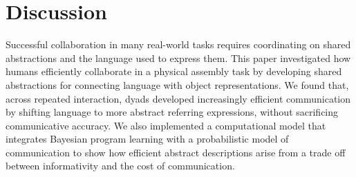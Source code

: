 \documentclass[10pt,letterpaper]{article}
\begin{document}
\section{Discussion}



Successful collaboration in many real-world tasks requires coordinating on shared abstractions and the language used to express them. 
This paper investigated how humans efficiently collaborate in a physical assembly task by developing shared abstractions for connecting language with object representations. 
We found that, across repeated interaction, dyads developed increasingly efficient communication by shifting language to more abstract referring expressions, without sacrificing communicative accuracy. 
We also implemented a computational model that integrates Bayesian program learning with a probabilistic model of communication to show how efficient abstract descriptions arise from a trade off between informativity and the cost of communication. 




\end{document}
